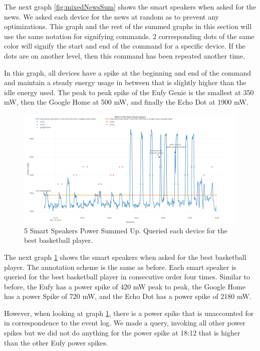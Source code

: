 The next graph \ref{fig:mixedNewsSum} shows the smart speakers when asked for the news. We asked each device for the news at random as to prevent any optimizations. This graph and the rest of the summed graphs in this section will use the same notation for signifying commands. 2 corresponding dots of the same color will signify the start and end of the command for a specific device. If the dots are on another level, then this command has been repeated another time.

In this graph, all devices have a spike at the beginning and end of the command and maintain a steady energy usage in between that is slightly higher than the idle energy used. The peak to peak spike of the Eufy Genie is the smallest at 350 mW, then the Google Home at 500 mW, and finally the Echo Dot at 1900 mW.

\begin{figure}[H]
  \centering
  \includegraphics[width=1\textwidth]{figures/bestBballSum.png}
  \caption{5 Smart Speakers Power Summed Up. Queried each device for the
  best basketball player.}
  \label{fig:bestBballSum}
\end{figure}

The next graph \ref{fig:bestBballSum} shows the smart speakers when asked for the best basketball player. The annotation scheme is the same as before. Each smart speaker is queried for the best basketball player in consecutive order four times. Similar to before, the Eufy has a power spike of 420 mW peak to peak, the Google Home has a power Spike of 720 mW, and the Echo Dot has a power spike of 2180 mW.

However, when looking at graph \ref{fig:bestBballSum}, there is a power spike that is unaccounted for in correspondence to the event log. We made a query, invoking all other power spikes but we did not do anything for the power spike at 18:12 that is higher than the other Eufy power spikes.

